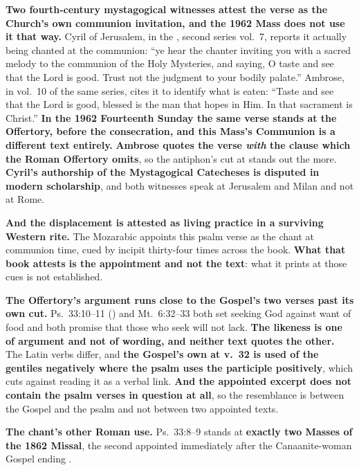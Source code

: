 \textbf{Two fourth-century mystagogical witnesses attest the verse as the
Church's own communion invitation, and the 1962 Mass does not use it that way.}
Cyril of Jerusalem, in the , second
series vol.~7, reports it actually being chanted at the communion: ``ye hear
the chanter inviting you with a sacred melody to the communion of the Holy
Mysteries, and saying, O taste and see that the Lord is good. Trust not the
judgment to your bodily palate.'' Ambrose, in vol.~10 of the same series, cites it to identify what is eaten:
``Taste and see that the Lord is good, blessed is the man that hopes in Him. In
that sacrament is Christ.'' \textbf{In the 1962 Fourteenth Sunday the same verse
stands at the Offertory, before the consecration, and this Mass's Communion is a
different text entirely.} \textbf{Ambrose quotes the verse \emph{with} the
clause  which the Roman Offertory omits}, so
the antiphon's cut at  stands out the more.
\textbf{Cyril's authorship of the Mystagogical Catecheses is disputed in modern
scholarship}, and both witnesses speak at Jerusalem and Milan and not at Rome.

\textbf{And the displacement is attested as living practice in a surviving
Western rite.} The Mozarabic  appoints this psalm verse as
the  chant at communion time, cued by incipit thirty-four
times across the book. \textbf{What that book attests is the appointment
and not the text}: what it prints at those cues is not established.

\textbf{The Offertory's argument runs close to the Gospel's two verses past its
own cut.} Ps.\ 33:10--11 () and
Mt.\ 6:32--33 both set seeking God against want of food and both promise that
those who seek will not lack. \textbf{The likeness is one of argument and not of
wording, and neither text quotes the other.}
The Latin verbs differ, and \textbf{the Gospel's own  at v.~32
is used of the gentiles negatively where the psalm uses the participle
positively}, which cuts against reading it as a verbal link. \textbf{And the
appointed excerpt does not contain the psalm verses in question at all}, so the
resemblance is between the Gospel and the psalm and not between two appointed
texts.

\textbf{The chant's other Roman use.} Ps.\ 33:8--9 stands at \textbf{exactly two
Masses of the 1862 Missal}, the second appointed immediately after the
Canaanite-woman Gospel ending .


